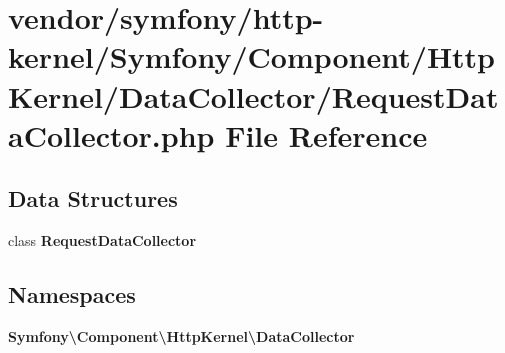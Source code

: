 \section{vendor/symfony/http-\/kernel/\+Symfony/\+Component/\+Http\+Kernel/\+Data\+Collector/\+Request\+Data\+Collector.php File Reference}
\label{_request_data_collector_8php}
\subsection*{Data Structures}
\begin{DoxyCompactItemize}
\item 
class {\bf Request\+Data\+Collector}
\end{DoxyCompactItemize}
\subsection*{Namespaces}
\begin{DoxyCompactItemize}
\item 
 {\bf Symfony\textbackslash{}\+Component\textbackslash{}\+Http\+Kernel\textbackslash{}\+Data\+Collector}
\end{DoxyCompactItemize}
